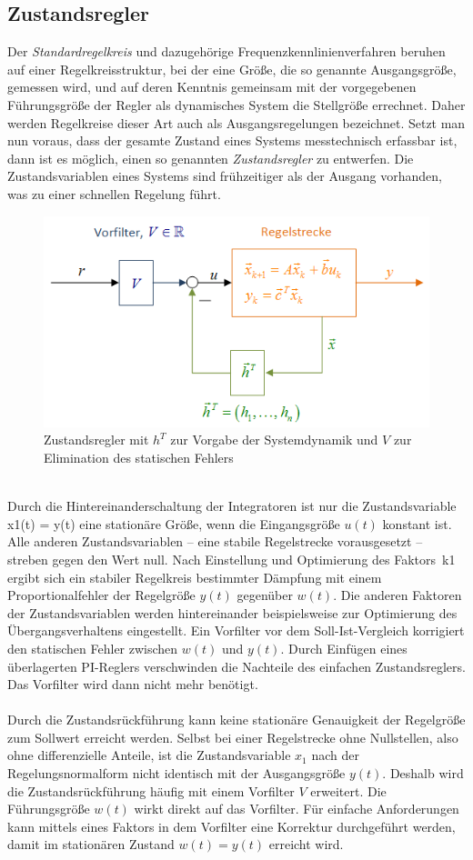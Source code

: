 	\subsection{Zustandsregler}
		Der \textit{Standardregelkreis} und dazugehörige Frequenzkennlinienverfahren beruhen auf einer Regelkreisstruktur, bei der eine Größe, die so genannte Ausgangsgröße, gemessen wird, und auf deren Kenntnis gemeinsam mit der vorgegebenen Führungsgröße der Regler als dynamisches System die Stellgröße errechnet. Daher werden Regelkreise dieser Art auch als Ausgangsregelungen bezeichnet. Setzt man nun voraus, dass der gesamte Zustand eines Systems messtechnisch erfassbar ist, dann ist es möglich, einen so genannten \textit{Zustandsregler} zu entwerfen. Die Zustandsvariablen eines Systems sind frühzeitiger als der Ausgang vorhanden, was zu einer schnellen Regelung führt.
		\begin{figure}[h]
			\centering
			\includegraphics[width=0.7\linewidth]{./pics/re/zust}
			\caption{Zustandsregler mit $ h^{T} $ zur Vorgabe der Systemdynamik und $ V $ zur Elimination des statischen Fehlers}
		\end{figure}
		\leavevmode\\
		Durch die Hintereinanderschaltung der Integratoren ist nur die Zustandsvariable x1(t) = y(t) eine stationäre Größe, wenn die Eingangsgröße 	$ 	u ( t )$ konstant ist. Alle anderen Zustandsvariablen – eine stabile Regelstrecke vorausgesetzt – streben gegen den Wert null. Nach Einstellung und Optimierung des Faktors k1 ergibt sich ein stabiler Regelkreis bestimmter Dämpfung mit einem Proportionalfehler der Regelgröße	$ y ( t ) $	gegenüber 
		$ 	w ( t ) $. Die anderen Faktoren der Zustandsvariablen werden hintereinander beispielsweise zur Optimierung des Übergangsverhaltens eingestellt.
		Ein Vorfilter vor dem Soll-Ist-Vergleich korrigiert den statischen Fehler zwischen $ 	w ( t ) $ und 	$ 	y ( t ) $. Durch Einfügen eines überlagerten PI-Reglers verschwinden die Nachteile des einfachen Zustandsreglers. Das Vorfilter wird dann nicht mehr benötigt.\\\\
		Durch die Zustandsrückführung kann keine stationäre Genauigkeit der Regelgröße zum Sollwert erreicht werden. Selbst bei einer Regelstrecke ohne Nullstellen, also ohne differenzielle Anteile, ist die Zustandsvariable $ x_{1} $ nach der Regelungsnormalform nicht identisch mit der Ausgangsgröße $ y(t) $. Deshalb wird die Zustandsrückführung häufig mit einem Vorfilter $ V $ erweitert. Die Führungsgröße $ w ( t ) $ wirkt direkt auf das Vorfilter. Für einfache Anforderungen kann mittels eines Faktors in dem Vorfilter eine Korrektur durchgeführt werden, damit im stationären Zustand $ 	w ( t ) = y ( t ) $ erreicht wird.

